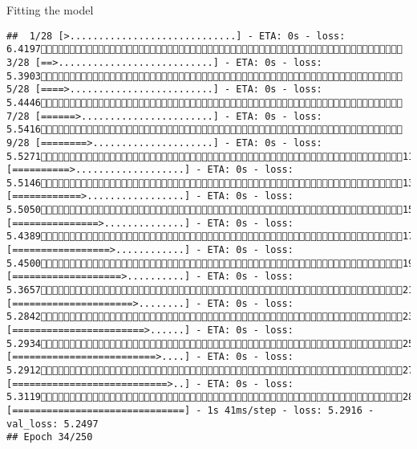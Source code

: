 \documentclass[
  ignorenonframetext,
]{beamer}
\begin{document}
\begin{frame}[fragile]{Fitting the model}
\begin{verbatim}
##  1/28 [>.............................] - ETA: 0s - loss: 6.4197 3/28 [==>...........................] - ETA: 0s - loss: 5.3903 5/28 [====>.........................] - ETA: 0s - loss: 5.4446 7/28 [======>.......................] - ETA: 0s - loss: 5.5416 9/28 [========>.....................] - ETA: 0s - loss: 5.527111/28 [==========>...................] - ETA: 0s - loss: 5.514613/28 [============>.................] - ETA: 0s - loss: 5.505015/28 [===============>..............] - ETA: 0s - loss: 5.438917/28 [=================>............] - ETA: 0s - loss: 5.450019/28 [===================>..........] - ETA: 0s - loss: 5.365721/28 [=====================>........] - ETA: 0s - loss: 5.284223/28 [=======================>......] - ETA: 0s - loss: 5.293425/28 [=========================>....] - ETA: 0s - loss: 5.291227/28 [===========================>..] - ETA: 0s - loss: 5.311928/28 [==============================] - 1s 41ms/step - loss: 5.2916 - val_loss: 5.2497
## Epoch 34/250

\end{verbatim}
\end{frame}
\end{document}
